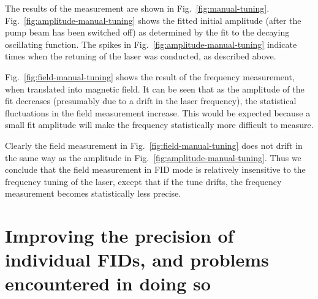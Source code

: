 \begin{itemize}
The results of the measurement are shown in
Fig.~\ref{fig:manual-tuning}.  Fig.~\ref{fig:amplitude-manual-tuning}
shows the fitted initial amplitude (after the pump beam has been
switched off) as determined by the fit to the decaying oscillating
function.  The spikes in Fig.~\ref{fig:amplitude-manual-tuning}
indicate times when the retuning of the laser was conducted, as
described above.

Fig.~\ref{fig:field-manual-tuning} shows the result of the frequency
measurement, when translated into magnetic field.  It can be seen that
as the amplitude of the fit decreases (presumably due to a drift in
the laser frequency), the statistical fluctuations in the field
measurement increase.  This would be expected because a small fit
amplitude will make the frequency statistically more difficult to
measure.

Clearly the field measurement in Fig.~\ref{fig:field-manual-tuning}
does not drift in the same way as the amplitude in
Fig.~\ref{fig:amplitude-manual-tuning}.  Thus we conclude that the
field measurement in FID mode is relatively insensitive to the
frequency tuning of the laser, except that if the tune drifts, the
frequency measurement becomes statistically less precise.


\end{itemize}


\section{Improving the precision of individual FIDs, and problems encountered in doing so\label{sec:reference-frequency}}

